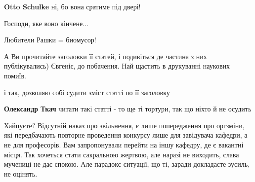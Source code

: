 \begin{itemize}
\begin{itemize}
\textbf{Otto Schulke} ні, бо вона сратиме під двері!
\end{itemize}

 
Господи, яке воно кінчене...

 
Любители Рашки = биомусор!

 
А Ви прочитайте заголовки її статей, і подивіться де частина з них публікувались) Євгеніє, до побачення. Най щастить в друкуванні наукових помиїв.

\begin{itemize}
 
і так, дозволяю собі судити зміст статті по її заголовку

 
\textbf{Олександр Ткач} читати такі статті - то ще ті тортури, так що ніхто й не осудить
\end{itemize}

 
Хайпуєте? Відсутній наказ про звільнення, є лише попередження про оргзміни, які
передбачають повторне проведення конкурсу лише для завідувача кафедри, а не для
професорів. Вам запропонували перейти на іншу кафедру, де є вакантні місця. Так
хочеться стати сакральною жертвою, але наразі не виходить, слава мучениці не
дає спокою. Але парадокс ситуації, що ті, заради докладаєте зусиль, не оцінять.


\end{itemize}
